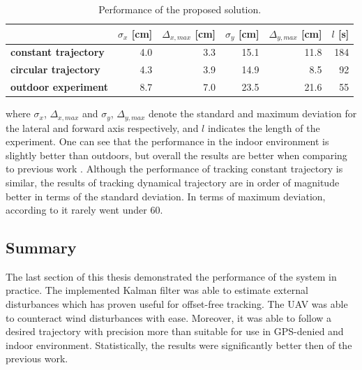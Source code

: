 \begin{table}[h]
\centering
\begin{tabular}{lrrrrr}
\hline
 & $\sigma_x$ [cm] & $\Delta_{x, max}$ [cm] & $\sigma_y$ [cm] & $\Delta_{y, max}$ [cm] & $l$ [s]\\
\hline
\textbf{constant trajectory} & 4.0 & 3.3 & 15.1 & 11.8 & 184 \\
\textbf{circular trajectory} & 4.3 & 3.9 & 14.9 & 8.5 & 92\\
\textbf{outdoor experiment} & 8.7 & 7.0 & 23.5 & 21.6 & 55\\
\hline
\end{tabular}
\caption{Performance of the proposed solution.}
\label{tab:compparison1}
\end{table}

where $\sigma_x$, $\Delta_{x, max}$ and $\sigma_y$, $\Delta_{y, max}$ denote the standard and maximum deviation for the lateral and forward axis respectively, and $l$ indicates the length of the experiment. One can see that the performance in the indoor environment is slightly better than outdoors, but overall the results are better when comparing to previous work \citep{endrych2014}. Although the performance of tracking constant trajectory is similar, the results of tracking dynamical trajectory are in order of magnitude better in terms of the standard deviation. In terms of maximum deviation, according to \citep{endrych2014} it rarely went under 60.

\subsection{Summary}

The last section of this thesis demonstrated the performance of the system in practice. The implemented Kalman filter was able to estimate external disturbances which has proven useful for offset-free tracking. The UAV was able to counteract wind disturbances with ease. Moreover, it was able to follow a desired trajectory with precision more than suitable for use in GPS-denied and indoor environment. Statistically, the results were significantly better then of the previous work. 